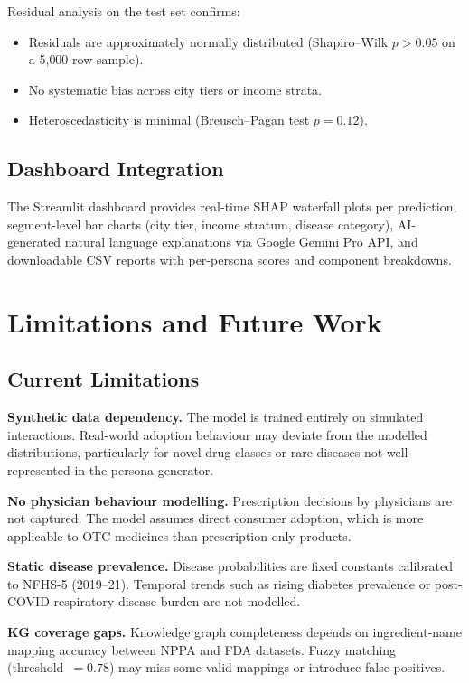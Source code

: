 \documentclass[10pt,journal,compsoc]{IEEEtran}
\begin{document}
Residual analysis on the test set confirms:
\begin{itemize}
  \item Residuals are approximately normally distributed
        (Shapiro--Wilk $p>0.05$ on a 5{,}000-row sample).
  \item No systematic bias across city tiers or income strata.
  \item Heteroscedasticity is minimal (Breusch--Pagan test $p=0.12$).
\end{itemize}

\subsection{Dashboard Integration}

The Streamlit dashboard provides real-time SHAP waterfall plots per prediction,
segment-level bar charts (city tier, income stratum, disease category),
AI-generated natural language explanations via Google Gemini Pro API, and
downloadable CSV reports with per-persona scores and component breakdowns.

\section{Limitations and Future Work}
\label{sec:limits}

\subsection{Current Limitations}

\textbf{Synthetic data dependency.}
The model is trained entirely on simulated interactions.
Real-world adoption behaviour may deviate from the modelled distributions,
particularly for novel drug classes or rare diseases not well-represented in the
persona generator.

\textbf{No physician behaviour modelling.}
Prescription decisions by physicians are not captured.
The model assumes direct consumer adoption, which is more applicable to OTC medicines
than prescription-only products.

\textbf{Static disease prevalence.}
Disease probabilities are fixed constants calibrated to NFHS-5 (2019--21).
Temporal trends such as rising diabetes prevalence or post-COVID respiratory disease
burden are not modelled.

\textbf{KG coverage gaps.}
Knowledge graph completeness depends on ingredient-name mapping accuracy between NPPA
and FDA datasets.
Fuzzy matching (threshold~$=0.78$) may miss some valid mappings or introduce false
positives.
\end{document}
